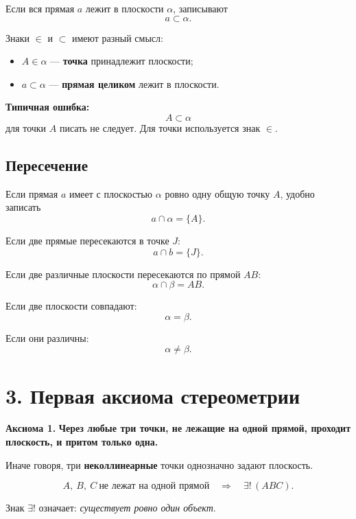 \documentclass[a4paper,12pt]{article}
\newcommand{\term}[1]{\textcolor{darkaccent}{\textbf{#1}}}
\newcommand{\important}[1]{\textbf{\textcolor{darkaccent}{#1}}}
\newcommand{\plane}[1]{(#1)}
\newcommand{\Axiom}[1]{\textcolor{darkaccent}{\textbf{Аксиома #1.}}}
\begin{document}
Если вся прямая $a$ лежит в плоскости $\alpha$, записывают
\[
a\subset\alpha.
\]

Знаки $\in$ и $\subset$ имеют разный смысл:

\begin{itemize}
  \item $A\in\alpha$ --- \textbf{точка} принадлежит плоскости;
  \item $a\subset\alpha$ --- \textbf{прямая целиком} лежит в плоскости.
\end{itemize}

\important{Типичная ошибка:}
\[
A\subset\alpha
\]
для точки $A$ писать не следует. Для точки используется знак $\in$.

\subsection*{\textcolor{accent}{Пересечение}}

Если прямая $a$ имеет с плоскостью $\alpha$ ровно одну общую точку $A$, удобно записать
\[
a\cap\alpha=\{A\}.
\]

Если две прямые пересекаются в точке $J$:
\[
a\cap b=\{J\}.
\]

Если две различные плоскости пересекаются по прямой $AB$:
\[
\alpha\cap\beta=AB.
\]

Если две плоскости совпадают:
\[
\alpha=\beta.
\]

Если они различны:
\[
\alpha\ne\beta.
\]


\section*{\textcolor{darkaccent}{3. Первая аксиома стереометрии}}

\Axiom{1}
\important{Через любые три точки, не лежащие на одной прямой, проходит плоскость, и притом только одна.}

Иначе говоря, три \term{неколлинеарные} точки однозначно задают плоскость.

\[
A,\ B,\ C\ \text{не лежат на одной прямой}
\quad\Longrightarrow\quad
\exists!\,\plane{ABC}.
\]

Знак $\exists!$ означает: \textit{существует ровно один объект}.
\end{document}
